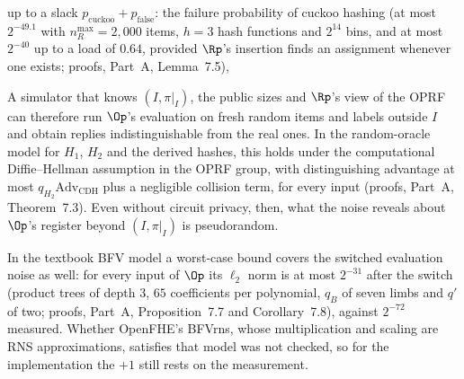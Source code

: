 up to a slack $p_{\mathrm{cuckoo}} + p_{\mathrm{false}}$: the failure probability of cuckoo hashing (at most $2^{-49.1}$ with $n_R^{\max} = 2{,}000$ items, $h = 3$ hash functions and $2^{14}$ bins, and at most $2^{-40}$ up to a load of $0.64$, provided $\Rp$'s insertion finds an assignment whenever one exists; proofs, Part~A, Lemma~7.5),

A simulator that knows $(I, \pi|_I)$, the public sizes and $\Rp$'s view of the OPRF can therefore run $\Op$'s evaluation on fresh random items and labels outside $I$ and obtain replies indistinguishable from the real ones. In the random-oracle model for $H_1$, $H_2$ and the derived hashes, this holds under the computational Diffie--Hellman assumption in the OPRF group, with distinguishing advantage at most $q_{H_2}\mathrm{Adv}_{\mathrm{CDH}}$ plus a negligible collision term, for every input (proofs, Part~A, Theorem~7.3). Even without circuit privacy, then, what the noise reveals about $\Op$'s register beyond $(I, \pi|_I)$ is pseudorandom.

In the textbook BFV model a worst-case bound covers the switched evaluation noise as well: for every input of $\Op$ its $\ell_2$ norm is at most $2^{-31}$ after the switch (product trees of depth $3$, $65$ coefficients per polynomial, $q_B$ of seven limbs and $q'$ of two; proofs, Part~A, Proposition~7.7 and Corollary~7.8), against $2^{-72}$ measured. Whether OpenFHE's BFVrns, whose multiplication and scaling are RNS approximations, satisfies that model was not checked, so for the implementation the $+1$ still rests on the measurement.

